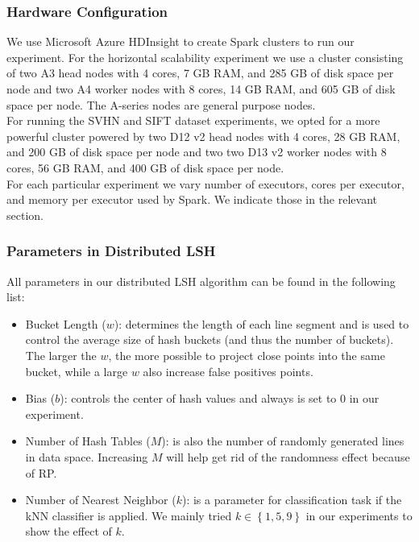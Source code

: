 \documentclass[letterpaper,twocolumn,10pt]{article}
\theoremstyle{definition}
\begin{document}
\subsubsection{Hardware Configuration}

We use Microsoft Azure HDInsight to create Spark clusters to run our 
experiment. For the horizontal scalability experiment we use a cluster consisting 
of two A3 head nodes with 4 cores, 7 GB RAM, and 285 GB of disk space per node and 
two A4 worker nodes with 8 cores, 14 GB RAM, and 605 GB of disk space per node. The 
A-series nodes are general purpose nodes.  \\ 

For running the SVHN and SIFT dataset experiments, we opted for a more powerful 
cluster powered by two D12 v2 head nodes with 4 cores, 28 GB RAM, and 200 GB of 
disk space per node and two two D13 v2 worker nodes with 8 cores, 56 GB RAM, and 
400 GB of disk space per node. \\

For each particular experiment we vary number of executors, cores per executor, and 
memory per executor used by Spark. We indicate those in the relevant section.

\subsubsection{Parameters in Distributed LSH }

All parameters in our distributed LSH algorithm can be found in the following list:

\begin{itemize}
	\item Bucket Length ($w$): determines the length of each line segment and is used to control the average size of hash buckets (and thus the number of buckets). The larger the $w$, the more possible to project close points into the same bucket, while a large $w$ also increase false positives points.
	\item Bias ($b$): controls the center of hash values and always is set to 0 in our experiment.
	\item Number of Hash Tables ($M$): is also the number of randomly generated lines in data space. Increasing $M$ will help get rid of the randomness effect because of RP. 
	\item Number of Nearest Neighbor ($k$): is a parameter for classification task if the kNN classifier is applied. We mainly tried $k \in \left\{1, 5, 9\right\}$ in our experiments to show the effect of $k$.
\end{itemize}
\end{document}
